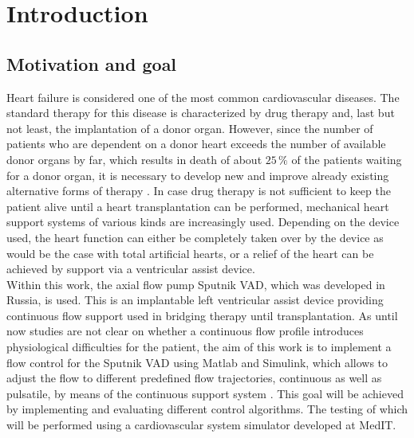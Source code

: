\chapter{Introduction}
\section{Motivation and goal}
Heart failure is considered one of the most common cardiovascular diseases. The standard therapy for this disease is characterized by drug therapy and, last but not least, the implantation of a donor organ. However, since the number of patients who are dependent on a donor heart exceeds the number of available donor organs by far, which results in death of about $25\,\%$ of the patients waiting for a donor organ, it is necessary to develop new and improve already existing alternative forms of therapy \cite{VAD2}.
In case drug therapy is not sufficient to keep the patient alive until a heart transplantation can be performed, mechanical heart support systems of various kinds are increasingly used. Depending on the device used, the heart function can either be completely taken over by the device as would be the case with total artificial hearts, or a relief of the heart can be achieved by support via a ventricular assist device.
\\Within this work, the axial flow pump Sputnik VAD, which was developed in Russia, is used. This is an implantable left ventricular assist device providing continuous flow support used in bridging therapy until transplantation.
As until now studies are not clear on whether a continuous flow profile introduces physiological difficulties for the patient,
the aim of this work is to implement a flow control for the Sputnik VAD using Matlab and Simulink, which allows to adjust the flow to different predefined flow trajectories, continuous as well as pulsatile, by means of the continuous support system \cite{VAD3}. This goal will be achieved by implementing and evaluating different control algorithms. The testing of which will be performed using a cardiovascular system simulator developed at MedIT.
